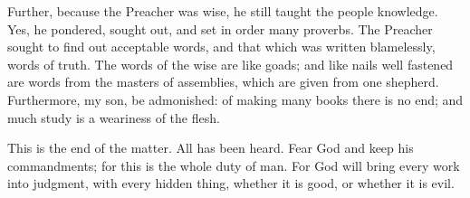 {\par }{\PP {}Further, because the Preacher was wise, he still taught the people knowledge. Yes, he pondered, sought out, and set in order many proverbs.
The Preacher sought to find out acceptable words, and that which was written blamelessly, words of truth.
The words of the wise are like goads; and like nails well fastened are words from the masters of assemblies, which are given from one shepherd.
Furthermore, my son, be admonished: of making many books there is no end; and much study is a weariness of the flesh.
\par }{\PP {}This is the end of the matter. All has been heard. Fear God and keep his commandments; for this is the whole duty of man.
For God will bring every work into judgment, with every hidden thing, whether it is good, or whether it is evil.
\par }